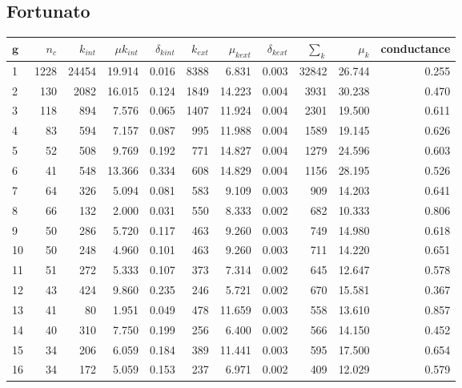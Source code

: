 \subsection{Fortunato}

\begin{table}[ht]
\centering
\begin{adjustbox}{max width=\textwidth}
\setlength{\extrarowheight}{2pt}
\begin{tabular}{lrrrrrrrrrr}
  \toprule
$\mathbf{g}$ & $n_c$ & $k_{int}$ & $\mu k_{int}$ & $\delta_{k int}$ & $k_{ext}$ & $\mu_{k ext}$ & $\delta_{k ext}$ & $\sum_k$ & $\mu_k$ & conductance \\ 
  \midrule
1 & 1228 & 24454 & 19.914 & 0.016 & 8388 & 6.831 & 0.003 & 32842 & 26.744 & 0.255 \\ 
  2 & 130 & 2082 & 16.015 & 0.124 & 1849 & 14.223 & 0.004 & 3931 & 30.238 & 0.470 \\ 
  3 & 118 & 894 & 7.576 & 0.065 & 1407 & 11.924 & 0.004 & 2301 & 19.500 & 0.611 \\ 
  4 & 83 & 594 & 7.157 & 0.087 & 995 & 11.988 & 0.004 & 1589 & 19.145 & 0.626 \\ 
  5 & 52 & 508 & 9.769 & 0.192 & 771 & 14.827 & 0.004 & 1279 & 24.596 & 0.603 \\ 
  6 & 41 & 548 & 13.366 & 0.334 & 608 & 14.829 & 0.004 & 1156 & 28.195 & 0.526 \\ 
  7 & 64 & 326 & 5.094 & 0.081 & 583 & 9.109 & 0.003 & 909 & 14.203 & 0.641 \\ 
  8 & 66 & 132 & 2.000 & 0.031 & 550 & 8.333 & 0.002 & 682 & 10.333 & 0.806 \\ 
  9 & 50 & 286 & 5.720 & 0.117 & 463 & 9.260 & 0.003 & 749 & 14.980 & 0.618 \\ 
  10 & 50 & 248 & 4.960 & 0.101 & 463 & 9.260 & 0.003 & 711 & 14.220 & 0.651 \\ 
  11 & 51 & 272 & 5.333 & 0.107 & 373 & 7.314 & 0.002 & 645 & 12.647 & 0.578 \\ 
  12 & 43 & 424 & 9.860 & 0.235 & 246 & 5.721 & 0.002 & 670 & 15.581 & 0.367 \\ 
  13 & 41 & 80 & 1.951 & 0.049 & 478 & 11.659 & 0.003 & 558 & 13.610 & 0.857 \\ 
  14 & 40 & 310 & 7.750 & 0.199 & 256 & 6.400 & 0.002 & 566 & 14.150 & 0.452 \\ 
  15 & 34 & 206 & 6.059 & 0.184 & 389 & 11.441 & 0.003 & 595 & 17.500 & 0.654 \\ 
  16 & 34 & 172 & 5.059 & 0.153 & 237 & 6.971 & 0.002 & 409 & 12.029 & 0.579 \\ 

\end{tabular}
\end{adjustbox}
\end{table}
